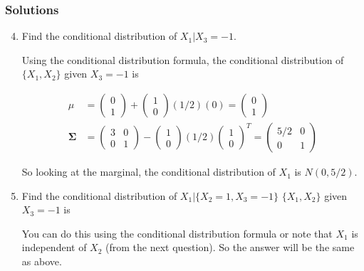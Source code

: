 \documentclass{beamer}
\begin{document}
\begin{frame}
\frametitle{Solutions}
\begin{enumerate}
\setcounter{enumi}{3}
\item Find the conditional distribution of $X_1|X_3 = -1$.
\vspace{5mm}

Using the conditional distribution formula, the conditional distribution of $\{X_1, X_2\}$ given $X_3 = -1$ is

\begin{align*}
\mu &= \begin{pmatrix} 0 \\ 1 \end{pmatrix} + \begin{pmatrix} 1 \\ 0 \end{pmatrix} (1/2) (0) =  \begin{pmatrix} 0 \\ 1 \end{pmatrix}\\
\mathbf{\Sigma} &= \begin{pmatrix} 3 & 0 \\0 & 1 \end{pmatrix} - \begin{pmatrix} 1 \\ 0 \end{pmatrix}(1/2) \begin{pmatrix} 1 \\ 0 \end{pmatrix}^T = \begin{pmatrix}5/2 & 0\\0 & 1\end{pmatrix}
\end{align*}

So looking at the marginal, the conditional distribution of $X_1$ is $N(0, 5/2)$.

\item Find the conditional distribution of $X_1|\{X_2 = 1, X_3 = -1\}$
$\{X_1, X_2\}$ given $X_3 = -1$ is

You can do this using the conditional distribution formula or note that $X_1$ is independent of $X_2$ (from the next question).  So the answer will be the same as above.
\end{enumerate}
\end{frame}
\end{document}
